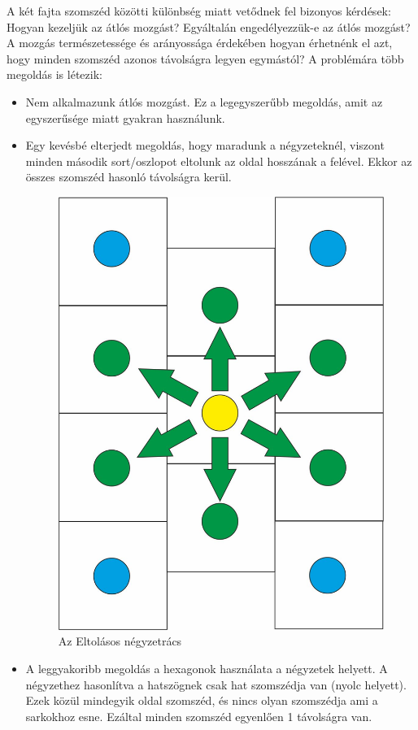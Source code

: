 \noindent A két fajta szomszéd közötti különbség miatt vetődnek fel bizonyos kérdések: Hogyan kezeljük az átlós mozgást? Egyáltalán engedélyezzük-e az átlós mozgást? A mozgás természetessége és arányossága érdekében hogyan érhetnénk el azt, hogy minden szomszéd azonos távolságra legyen egymástól?
\newline
\newline A problémára több megoldás is létezik:

\begin{itemize}
\item Nem alkalmazunk átlós mozgást. Ez a legegyszerűbb megoldás, amit az egyszerűsége miatt gyakran használunk.
\item Egy kevésbé elterjedt megoldás, hogy maradunk a négyzeteknél, viszont minden második sort/oszlopot eltolunk az oldal hosszának a felével. Ekkor az összes szomszéd hasonló távolságra kerül.

\begin{figure}[h!]
\centering
\includegraphics[scale=0.3]{kepek/SqOffsetDistance.jpg}
\caption{Az Eltolásos négyzetrács}
\label{fig:SqOffsetDistance}
\end{figure}

\item A leggyakoribb megoldás a hexagonok használata a négyzetek helyett. A négyzethez hasonlítva a hatszögnek csak hat szomszédja van (nyolc helyett). Ezek közül mindegyik oldal szomszéd, és nincs olyan szomszédja ami a sarkokhoz esne. Ezáltal minden szomszéd egyenlően 1 távolságra van.
\end{itemize}

